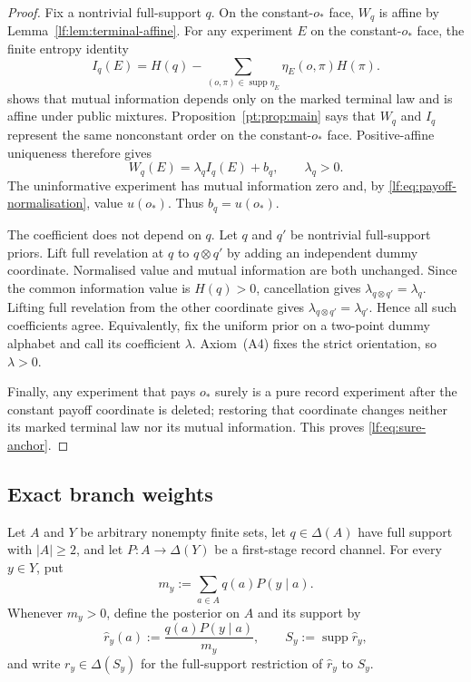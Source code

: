 \documentclass[11pt,a4paper]{article}
\theoremstyle{definition}
\newcommand{\D}{\Delta}
\newcommand{\Sh}{H}
\newcommand{\supp}{\operatorname{supp}}
\newcommand{\1}{\mathbf 1}
\begin{document}
\begin{proof}
Fix a nontrivial full-support $q$.  On the constant-$o_\ast$ face, $W_q$ is
affine by Lemma~\ref{lf:lem:terminal-affine}.  For any experiment $E$ on the constant-$o_\ast$ face, the
finite entropy identity
\begin{equation}
I_q(E)=\Sh(q)-\sum_{(o,\pi)\in\supp\eta_E}
\eta_E(o,\pi)\Sh(\pi).
\label{lf:eq:posterior-entropy}
\end{equation}
shows that mutual information depends only on the marked terminal law and is
affine under public mixtures.  Proposition~\ref{pt:prop:main} says that $W_q$ and
$I_q$ represent the same nonconstant order on the constant-$o_\ast$ face.
Positive-affine uniqueness therefore gives
\[
W_q(E)=\lambda_q I_q(E)+b_q,
\qquad \lambda_q>0.
\]
The uninformative experiment has mutual information zero and, by
\eqref{lf:eq:payoff-normalisation}, value $u(o_\ast)$.  Thus $b_q=u(o_\ast)$.

The coefficient does not depend on $q$.  Let $q$ and $q'$ be nontrivial
full-support priors.  Lift full revelation at $q$ to $q\otimes q'$ by adding an
independent dummy coordinate.  Normalised value and mutual information are both
unchanged.  Since the common information value is $\Sh(q)>0$, cancellation
gives $\lambda_{q\otimes q'}=\lambda_q$.  Lifting full revelation from the
other coordinate gives $\lambda_{q\otimes q'}=\lambda_{q'}$.  Hence all such
coefficients agree.  Equivalently, fix the uniform prior on a two-point dummy
alphabet and call its coefficient $\lambda$.  Axiom~\textup{(A4)} fixes the
strict orientation, so $\lambda>0$.

Finally, any experiment that pays $o_\ast$ surely is a pure record experiment
after the constant payoff coordinate is deleted; restoring that coordinate
changes neither its marked terminal law nor its mutual information.  This
proves \eqref{lf:eq:sure-anchor}.
\end{proof}

\subsection{Exact branch weights}

Let $A$ and $Y$ be arbitrary nonempty finite sets, let $q\in\D(A)$ have full
support with $\lvert A\rvert\ge2$, and let
$P:A\to\D(Y)$ be a first-stage record channel.  For every $y\in Y$, put
\[
m_y:=\sum_{a\in A}q(a)P(y\mid a).
\]
Whenever $m_y>0$, define the posterior on $A$ and its support by
\[
\widehat r_y(a):=\frac{q(a)P(y\mid a)}{m_y},
\qquad
S_y:=\supp\widehat r_y,
\]
and write $r_y\in\D(S_y)$ for the full-support restriction of
$\widehat r_y$ to $S_y$.
\end{document}
